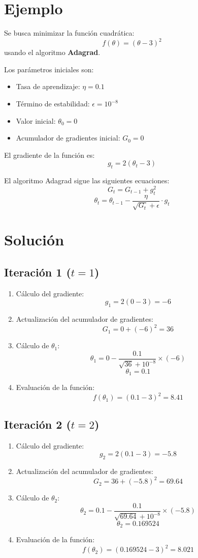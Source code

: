 \documentclass{article}
\begin{document}
\section*{Ejemplo}
Se busca minimizar la función cuadrática:
\[
f(\theta) = (\theta - 3)^2
\]
usando el algoritmo \textbf{Adagrad}. 

Los parámetros iniciales son:
\begin{itemize}
	\item Tasa de aprendizaje: \( \eta = 0.1 \)
	\item Término de estabilidad: \( \epsilon = 10^{-8} \)
	\item Valor inicial: \( \theta_0 = 0 \)
	\item Acumulador de gradientes inicial: \( G_0 = 0 \)
\end{itemize}

El gradiente de la función es:
\[
g_t = 2(\theta_t - 3)
\]

El algoritmo Adagrad sigue las siguientes ecuaciones:
\[
G_t = G_{t-1} + g_t^2
\]
\[
\theta_t = \theta_{t-1} - \frac{\eta}{\sqrt{G_t} + \epsilon} \cdot g_t
\]

\section*{Solución}

\subsection*{Iteración 1 (\( t = 1 \))}

\begin{enumerate}
	\item Cálculo del gradiente:
	\[
	g_1 = 2(0 - 3) = -6
	\]
	\item Actualización del acumulador de gradientes:
	\[
	G_1 = 0 + (-6)^2 = 36
	\]
	\item Cálculo de \( \theta_1 \):
	\[
	\theta_1 = 0 - \frac{0.1}{\sqrt{36} + 10^{-8}} \times (-6)
	\]
	\[
	\theta_1 = 0.1
	\]
	\item Evaluación de la función:
	\[
	f(\theta_1) = (0.1 - 3)^2 = 8.41
	\]
\end{enumerate}

\subsection*{Iteración 2 (\( t = 2 \))}

\begin{enumerate}
	\item Cálculo del gradiente:
	\[
	g_2 = 2(0.1 - 3) = -5.8
	\]
	\item Actualización del acumulador de gradientes:
	\[
	G_2 = 36 + (-5.8)^2 = 69.64
	\]
	\item Cálculo de \( \theta_2 \):
	\[
	\theta_2 = 0.1 - \frac{0.1}{\sqrt{69.64} + 10^{-8}} \times (-5.8)
	\]
	\[
	\theta_2 = 0.169524
	\]
	\item Evaluación de la función:
	\[
	f(\theta_2) = (0.169524 - 3)^2 = 8.021
	\]
\end{enumerate}
\end{document}
